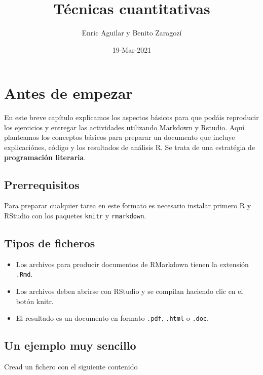 \documentclass[
]{book}
\title{Técnicas cuantitativas}
\author{Enric Aguilar y Benito Zaragozí}
\date{19-Mar-2021}
\providecommand{\tightlist}{%
  \setlength{\itemsep}{0pt}\setlength{\parskip}{0pt}}
\begin{document}
\maketitle

{
\setcounter{tocdepth}{1}
\tableofcontents
}
\hypertarget{antes-de-empezar}{%
\chapter{Antes de empezar}\label{antes-de-empezar}}

En este breve capítulo explicamos los aspectos básicos para que podáis reproducir los ejercicios y entregar las actividades utilizando Markdown y Rstudio. Aquí planteamos los conceptos básicos para preparar un documento que incluye explicaciónes, código y los resultados de análisis R. Se trata de una estratégia de \textbf{programación literaria}.

\hypertarget{prerrequisitos}{%
\section{Prerrequisitos}\label{prerrequisitos}}

Para preparar cualquier tarea en este formato es necesario instalar primero R y RStudio con los paquetes \texttt{knitr} y \texttt{rmarkdown}.

\hypertarget{tipos-de-ficheros}{%
\section{Tipos de ficheros}\label{tipos-de-ficheros}}

\begin{itemize}
\tightlist
\item
  Los archivos para producir documentos de RMarkdown tienen la extensión \texttt{.Rmd}.
\item
  Los archivos deben abrirse con RStudio y se compilan haciendo clic en el botón knitr.
\item
  El resultado es un documento en formato \texttt{.pdf}, \texttt{.html} o \texttt{.doc}.
\end{itemize}

\hypertarget{un-ejemplo-muy-sencillo}{%
\section{Un ejemplo muy sencillo}\label{un-ejemplo-muy-sencillo}}

Cread un fichero con el siguiente contenido
\end{document}

